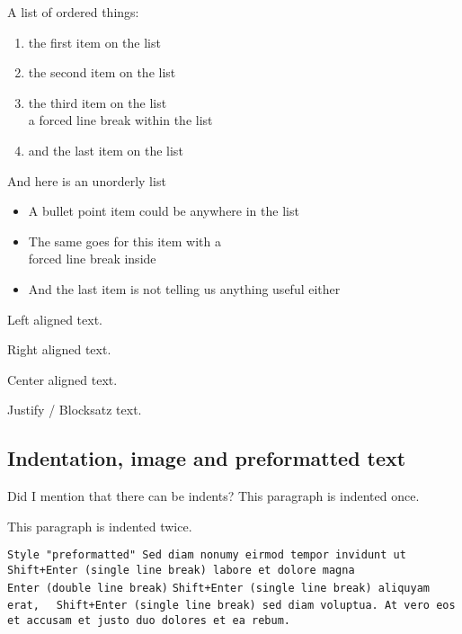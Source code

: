 A list of ordered things:

\begin{enumerate}  
\item the first item on the list 
\item the second item on the list 
\item the third item on the list\\a forced line break within the list
\item and the last item on the list
\end{enumerate}

And here is an unorderly list

\begin{itemize}
\item A bullet point item could be anywhere in the list
\item The same goes for this item with a\\forced line break inside
\item And the last item is not telling us anything useful either
\end{itemize}

\begin{flushleft}
Left aligned text. \lipsum[1]
\end{flushleft}

\begin{flushright}
Right aligned text. \lipsum[1]
\end{flushright}

\begin{center}
Center aligned text. \lipsum[1]
\end{center}

Justify /
Blocksatz text. \lipsum[1]

\subsection{Indentation, image and preformatted text}

\begin{adjustwidth}{2cm}{}Did I mention
that there can be indents? This paragraph is indented once.
\end{adjustwidth}

\begin{adjustwidth}{4cm}{}This paragraph
is indented twice.
\end{adjustwidth}

\lipsum[3]

\texttt{Style "preformatted" Sed diam nonumy eirmod tempor invidunt ut \\Shift+Enter (single line break) labore et dolore magna\\  Enter (double line break)}
\texttt{Shift+Enter (single line break) aliquyam erat, }
\texttt{   Shift+Enter (single line break) sed diam voluptua. At vero eos et accusam et justo duo dolores et ea rebum.}

